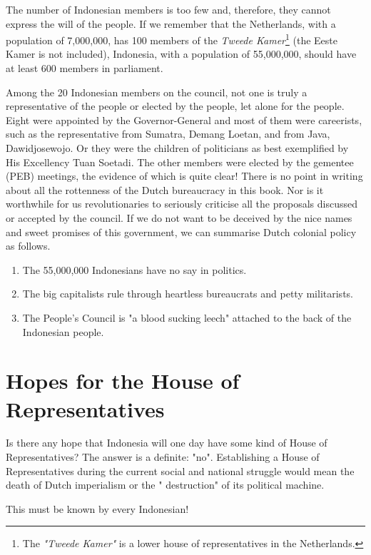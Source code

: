 The number of Indonesian members is too few and, therefore, they cannot express the will of the people. 
If we remember that the Netherlands, with a population of 7,000,000, has 100 members of the \emph{Tweede Kamer}\footnote[9]{The \emph{"Tweede Kamer"} is a lower house of representatives in the Netherlands.} 
(the Eeste Kamer is not included), Indonesia, with a population of 55,000,000, should have at least 600 members in parliament.\nline

Among the 20 Indonesian members on the council, not one is truly a representative of the people or elected by the people, 
let alone for the people. Eight were appointed by the Governor-General and most of them were careerists, such as the 
representative from Sumatra, Demang Loetan, and from Java, Dawidjosewojo. Or they were the children of politicians as 
best exemplified by His Excellency Tuan Soetadi. The other members were elected by the gementee (PEB) meetings, the 
evidence of which is quite clear! There is no point in writing about all the rottenness of the Dutch bureaucracy in 
this book. Nor is it worthwhile for us revolutionaries to seriously criticise all the proposals discussed or accepted 
by the council. If we do not want to be deceived by the nice names and sweet promises of this government, we can 
summarise Dutch colonial policy as follows.\nline

\begin{enumerate}
    \item The 55,000,000 Indonesians have no say in politics.
    \item The big capitalists rule through heartless bureaucrats and petty militarists.
    \item The People's Council is "a blood sucking leech" attached to the back of the Indonesian people.
\end{enumerate}

\section{Hopes for the House of Representatives}

Is there any hope that Indonesia will one day have some kind of House of Representatives? 
The answer is a definite: "no". Establishing a House of Representatives during the current 
social and national struggle would mean the death of Dutch imperialism or the " destruction" of its political machine.\nline

This must be known by every Indonesian!\nline

